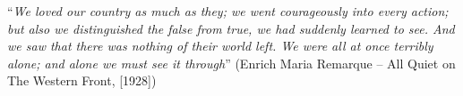 \begin{epigrafe}
    \vspace*{\fill}
{%
	\noindent\hspace{.5\textwidth}
	{\begin{minipage}{.5\textwidth}
			``\textit{We loved our country as much as they; we went courageously into every action; but also we distinguished the false from true, 
			we had suddenly learned to see. And we saw that there was nothing of their world left. We were all at once terribly alone; and alone we 
			must see it through}'' (Enrich Maria Remarque -- All Quiet on The Western Front, [1928])
	\end{minipage}}%
	\vspace*{3cm}
}%
\end{epigrafe}
